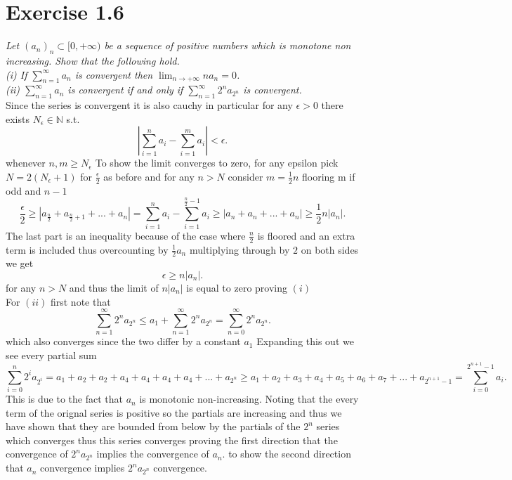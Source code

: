 \documentclass{amsart}
\begin{document}
    \section{Exercise 1.6}
    \emph{Let $(a_n)_n \subset [0,+\infty)$ be a sequence of positive numbers which is monotone
        non increasing. Show that the following hold.
        \\
        (i) If $\sum_{n=1}^{\infty}a_n$ is convergent then $\lim_{n\to +\infty}na_n =0$. \\
        (ii) $\sum_{n=1}^{\infty}a_n$ is convergent if and only if $\sum_{n=1}^{\infty}2^{n}a_{2^{n}}$ is convergent.\\
    }
    Since the series is convergent it is also cauchy in particular for any $\epsilon > 0$ there exists $N_\epsilon \in \mathbb{N}$ s.t.
    \[
    |\sum_{i=1}^{n}a_i - \sum_{i=1}^{m}a_i| < \epsilon
    .\] 
    whenever $n,m \ge N_\epsilon$
    To show the limit converges to zero, for any epsilon pick $N = 2(N_\epsilon+1)$ for $\frac{\epsilon}{2}$ as before and for any $n > N$ consider $m =  \frac{1}{2}n$ flooring m if odd and $n-1$
    \[
        \frac{\epsilon}{2} \ge |a_{\frac{n}{2}} + a_{\frac{n}{2}+1} + ... + a_{n}| = \sum_{i=1}^{n}a_i - \sum_{i=1}^{\frac{n}{2}-1}a_i \ge |a_{n} + a_{n} + ... + a_{n}| \ge \frac{1}{2}n|a_{n}| 
    .\] 
    The last part is an inequality because of the case where $\frac{n}{2}$ is floored and an extra term is included thus overcounting by $\frac{1}{2}a_n$
    multiplying through by $2$ on both sides we get
    \[
    \epsilon \ge n|a_n|
    .\] 
    for any $n > N$ and thus the limit of $n|a_n|$ is equal to zero proving $(i)$ \\
    For $(ii)$ first note that
     \[
         \sum_{n=1}^{\infty}2^{n}a_{2^{n}} \le a_1 + \sum_{n=1}^{\infty}2^{n}a_{2^{n}} = \sum_{n=0}^{\infty}2^{n}a_{2^{n}} 
    .\] which also converges since the two differ by a constant $a_1$
    Expanding this out we see every partial sum
    \[
        \sum_{i=0}^{n}2^{i}a_{2^{i}} = a_1 + a_2 + a_2 + a_4 + a_4 + a_4 + a_4 + ... + a_{2^{n}} \ge a_1 + a_2 + a_3 + a_4 + a_5 + a_6 + a_7 + ... + a_{2^{n+1}-1} = \sum_{i=0}^{2^{n+1}-1}a_i
    .\] 
    This is due to the fact that $a_n$ is monotonic non-increasing. Noting that the every term
    of the orignal series is positive so the partials are increasing and thus we have shown that they are bounded from below by 
    the partials of the $2^{n}$ series which converges thus this series converges proving the first direction that the convergence of $2^{n}a_{2^{n}}$ implies the convergence
    of $a_n$. to show the second direction that $a_n$ convergence implies $2^{n}a_{2^{n}}$ convergence.\\
\end{document}
